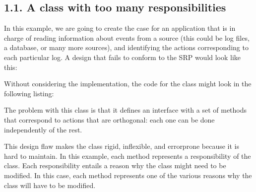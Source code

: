 \documentclass[a4paper,10pt,english]{sphinxmanual}
\begin{document}
\subsection{1.1. A class with too many responsibilities}
\label{\detokenize{chapters/4_solid_principles/index:a-class-with-too-many-responsibilities}}
In this example, we are going to create the case for an application that is in charge of
reading information about events from a source (this could be log files, a database, or many
more sources), and identifying the actions corresponding to each particular log.
A design that fails to conform to the SRP would look like this:

\begin{figure}[H]
\centering

\noindent{}
\end{figure}

Without considering the implementation, the code for the class might look in the following
listing:

\begin{sphinxVerbatim}[commandchars=\\\{\}]
 

     

     

     
\end{sphinxVerbatim}

The problem with this class is that it defines an interface with a set of methods that
correspond to actions that are orthogonal: each one can be done independently of the rest.

This design flaw makes the class rigid, inflexible, and error\sphinxhyphen{}prone because it is hard to
maintain. In this example, each method represents a responsibility of the class. Each
responsibility entails a reason why the class might need to be modified. In this case, each
method represents one of the various reasons why the class will have to be modified.
\end{document}
